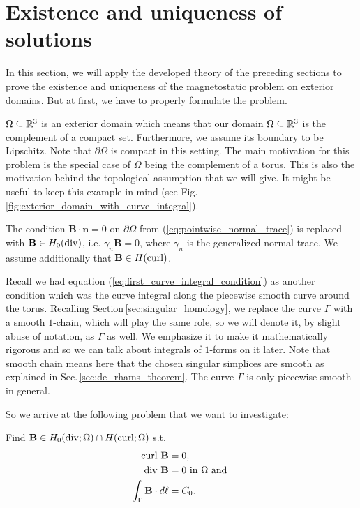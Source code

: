 \documentclass[../master_thesis.tex]{subfiles}
\begin{document}
\section{Existence and uniqueness of solutions}\label{sec:existence_and_uniqueness}

In this section, we will apply the developed theory of the preceding sections
to prove the existence and uniqueness of the magnetostatic problem 
on exterior domains. But at first, we have to properly formulate the problem.

$\Omega \subseteq \mathbb{R}^3$ is an exterior domain which means 
that our domain $\Omega \subseteq \mathbb{R}^3$
is the complement of a compact set. Furthermore, we assume its boundary to be 
Lipschitz. Note that $\partial \Omega$ is compact in this setting.
The main motivation for this problem is 
the special case of $\Omega$ being the complement of a torus. 
This is also the motivation behind the
topological assumption that we will give. It might be useful to keep this
example in mind (see Fig.\,\ref{fig:exterior_domain_with_curve_integral}).

The condition $\mathbf{B}\cdot \mathbf{n} = 0$ on $\partial\Omega$ from 
(\ref{eq:pointwise_normal_trace}) is replaced
with $\mathbf{B} \in H_0(\operatorname{div})$, i.e. $\gamma_n\mathbf{B} = 0$, where 
$\gamma_n$ is the generalized normal trace. We assume additionally that 
$\mathbf{B} \in H(\operatorname{curl})$. 

Recall we had equation (\ref{eq:first_curve_integral_condition}) as another condition
which was the curve integral along the piecewise smooth curve around the torus.
Recalling Section\,\ref{sec:singular_homology}, we replace the curve $\Gamma$
with a smooth $1$-chain, which will play the same role, so we will 
denote it, by slight abuse of notation, as $\Gamma$ as well. We emphasize 
it to make it mathematically rigorous and so we can talk about integrals 
of $1$-forms on it later. Note that smooth chain means here that the chosen 
singular simplices are smooth as explained in Sec.\,\ref{sec:de_rhams_theorem}. 
The curve $\Gamma$ is only piecewise smooth in 
general.

So we arrive at the following problem that we want to investigate:
\begin{problem}\label{prob:magnetostatic_problem}
    Find $\mathbf{B} \in H_0(\operatorname{div};\Omega) \cap H(\operatorname{curl};\Omega)$ s.t.
    \begin{align}
        \operatorname{curl} \, \mathbf{B} &= 0, \\ 
        \operatorname{div} \, \mathbf{B}  &= 0 \text{ in } \Omega \text{ and }\\
        \int_\Gamma \mathbf{B} \cdot d\ell &= C_0.
    \end{align}
\end{problem}
\end{document}
